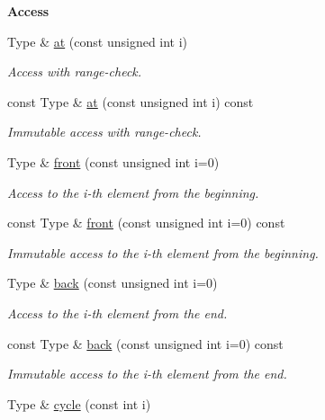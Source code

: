 \begin{Indent}{\bf Access}\par
\begin{DoxyCompactItemize}
\item 
Type \& \hyperlink{exceptionmagrathea_1_1Evolution_a4e211c75ef118a18fba646c3d5a802ee}{at} (const unsigned int i)
\begin{DoxyCompactList}\small\item\em Access with range-\/check. \end{DoxyCompactList}\item 
const Type \& \hyperlink{exceptionmagrathea_1_1Evolution_ae27da533bd1d819852794a00f68db764}{at} (const unsigned int i) const 
\begin{DoxyCompactList}\small\item\em Immutable access with range-\/check. \end{DoxyCompactList}\item 
Type \& \hyperlink{exceptionmagrathea_1_1Evolution_a61b94c64c5b1168536127cc46b38e34d}{front} (const unsigned int i=0)
\begin{DoxyCompactList}\small\item\em Access to the i-\/th element from the beginning. \end{DoxyCompactList}\item 
const Type \& \hyperlink{exceptionmagrathea_1_1Evolution_a05d57c038a17c1e231eb9b262c563170}{front} (const unsigned int i=0) const 
\begin{DoxyCompactList}\small\item\em Immutable access to the i-\/th element from the beginning. \end{DoxyCompactList}\item 
Type \& \hyperlink{exceptionmagrathea_1_1Evolution_ad6480feeca52a754178c8d22edd45f38}{back} (const unsigned int i=0)
\begin{DoxyCompactList}\small\item\em Access to the i-\/th element from the end. \end{DoxyCompactList}\item 
const Type \& \hyperlink{exceptionmagrathea_1_1Evolution_a737201f6eb8c6adb3f560aca14ff2e53}{back} (const unsigned int i=0) const 
\begin{DoxyCompactList}\small\item\em Immutable access to the i-\/th element from the end. \end{DoxyCompactList}\item 
Type \& \hyperlink{exceptionmagrathea_1_1Evolution_a9f708f9a57211588943dc1290b3fedb2}{cycle} (const int i)

\end{DoxyCompactItemize}
\end{Indent}
